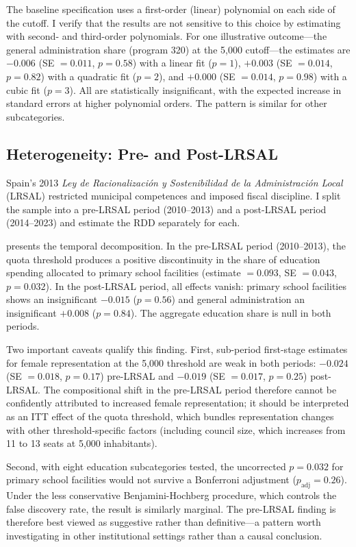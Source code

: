 \documentclass[12pt]{article}
\begin{document}
The baseline specification uses a first-order (linear) polynomial on each side of the cutoff. I verify that the results are not sensitive to this choice by estimating with second- and third-order polynomials. For one illustrative outcome---the general administration share (program 320) at the 5,000 cutoff---the estimates are $-0.006$ (SE $= 0.011$, $p = 0.58$) with a linear fit ($p = 1$), $+0.003$ (SE $= 0.014$, $p = 0.82$) with a quadratic fit ($p = 2$), and $+0.000$ (SE $= 0.014$, $p = 0.98$) with a cubic fit ($p = 3$). All are statistically insignificant, with the expected increase in standard errors at higher polynomial orders. The pattern is similar for other subcategories.


\subsection{Heterogeneity: Pre- and Post-LRSAL}

Spain's 2013 \emph{Ley de Racionalizaci\'{o}n y Sostenibilidad de la Administraci\'{o}n Local} (LRSAL) restricted municipal competences and imposed fiscal discipline. I split the sample into a pre-LRSAL period (2010--2013) and a post-LRSAL period (2014--2023) and estimate the RDD separately for each.

 presents the temporal decomposition. In the pre-LRSAL period (2010--2013), the quota threshold produces a positive discontinuity in the share of education spending allocated to primary school facilities (estimate $= 0.093$, SE $= 0.043$, $p = 0.032$). In the post-LRSAL period, all effects vanish: primary school facilities shows an insignificant $-0.015$ ($p = 0.56$) and general administration an insignificant $+0.008$ ($p = 0.84$). The aggregate education share is null in both periods.



Two important caveats qualify this finding. First, sub-period first-stage estimates for female representation at the 5,000 threshold are weak in both periods: $-0.024$ (SE $= 0.018$, $p = 0.17$) pre-LRSAL and $-0.019$ (SE $= 0.017$, $p = 0.25$) post-LRSAL. The compositional shift in the pre-LRSAL period therefore cannot be confidently attributed to increased female representation; it should be interpreted as an ITT effect of the quota threshold, which bundles representation changes with other threshold-specific factors (including council size, which increases from 11 to 13 seats at 5,000 inhabitants).

Second, with eight education subcategories tested, the uncorrected $p = 0.032$ for primary school facilities would not survive a Bonferroni adjustment ($p_{\text{adj}} = 0.26$). Under the less conservative Benjamini-Hochberg procedure, which controls the false discovery rate, the result is similarly marginal. The pre-LRSAL finding is therefore best viewed as suggestive rather than definitive---a pattern worth investigating in other institutional settings rather than a causal conclusion.
\end{document}
